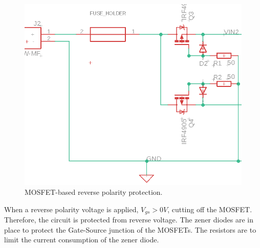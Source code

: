 \documentclass[../main.tex]{subfiles}
\begin{document}
    \begin{figure}[!h]
        \centerline{\includegraphics[scale=0.5]{media/reverse_voltage_protection.png}}
        \caption{MOSFET-based reverse polarity protection.}
        \label{fig:reverse_voltage_protection}
    \end{figure} 

    \justify
    When a reverse polarity voltage is applied, $V_{gs} > 0V$, cutting off the MOSFET. Therefore, the circuit is protected from reverse voltage. The zener diodes are in place to protect the Gate-Source junction of the MOSFETs. The resistors are to limit the current consumption of the zener diode.
\end{document}
